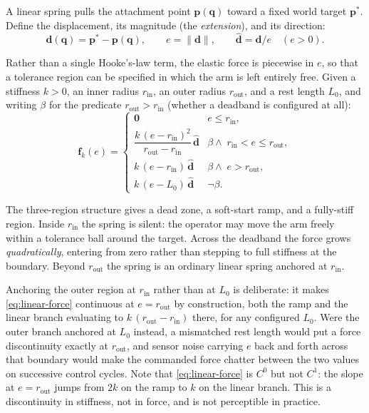 A linear spring pulls the attachment point $\bm{p}(\bm{q})$ toward a fixed
world target $\bm{p}^{*}$. Define the displacement, its magnitude (the
\emph{extension}), and its direction:
%
\begin{equation}
  \bm{d}(\bm{q}) = \bm{p}^{*} - \bm{p}(\bm{q}),
  \qquad
  e = \lVert\bm{d}\rVert,
  \qquad
  \hat{\bm{d}} = \bm{d}/e \quad (e > 0).
\end{equation}

Rather than a single Hooke's-law term, the elastic force is piecewise in $e$,
so that a tolerance region can be specified in which the arm is left entirely
free. Given a stiffness $k > 0$, an inner radius $r_{\mathrm{in}}$, an outer
radius $r_{\mathrm{out}}$, and a rest length $L_{0}$, and writing $\beta$ for
the predicate $r_{\mathrm{out}} > r_{\mathrm{in}}$ (whether a deadband is
configured at all):
%
\begin{equation}
  \bm{f}_{k}(e) =
  \begin{cases}
    \bm{0}
      & e \le r_{\mathrm{in}}, \\[6pt]
    \dfrac{k\,(e - r_{\mathrm{in}})^{2}}{r_{\mathrm{out}} - r_{\mathrm{in}}}\,
    \hat{\bm{d}}
      & \beta \wedge \; r_{\mathrm{in}} < e \le r_{\mathrm{out}}, \\[10pt]
    k\,(e - r_{\mathrm{in}})\,\hat{\bm{d}}
      & \beta \wedge \; e > r_{\mathrm{out}}, \\[6pt]
    k\,(e - L_{0})\,\hat{\bm{d}}
      & \neg\beta .
  \end{cases}
  \label{eq:linear-force}
\end{equation}

The three-region structure gives a dead zone, a soft-start ramp, and a
fully-stiff region. Inside $r_{\mathrm{in}}$ the spring is silent: the operator
may move the arm freely within a tolerance ball around the target. Across the
deadband the force grows \emph{quadratically}, entering from zero rather than
stepping to full stiffness at the boundary. Beyond $r_{\mathrm{out}}$ the
spring is an ordinary linear spring anchored at $r_{\mathrm{in}}$.

Anchoring the outer region at $r_{\mathrm{in}}$ rather than at $L_{0}$ is
deliberate: it makes \eqref{eq:linear-force} continuous at
$e = r_{\mathrm{out}}$ by construction, both the ramp and the linear branch
evaluating to $k\,(r_{\mathrm{out}} - r_{\mathrm{in}})$ there, for any
configured $L_{0}$. Were the outer branch anchored at $L_{0}$ instead, a
mismatched rest length would put a force discontinuity exactly at
$r_{\mathrm{out}}$, and sensor noise carrying $e$ back and forth across that
boundary would make the commanded force chatter between the two values on
successive control cycles. Note that \eqref{eq:linear-force} is $C^{0}$ but not
$C^{1}$: the slope at $e = r_{\mathrm{out}}$ jumps from $2k$ on the ramp to $k$
on the linear branch. This is a discontinuity in stiffness, not in force, and
is not perceptible in practice.

